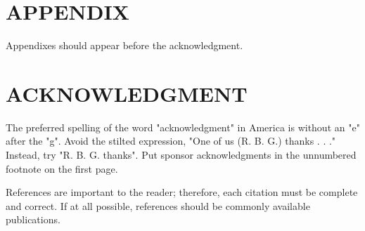 \documentclass[letterpaper, 10 pt, conference]{ieeeconf}  %
\begin{document}






\section*{APPENDIX}

Appendixes should appear before the acknowledgment.

\section*{ACKNOWLEDGMENT}

The preferred spelling of the word "acknowledgment" in America is without an "e" after the "g". Avoid the stilted expression, "One of us (R. B. G.) thanks . . ."  Instead, try "R. B. G. thanks". Put sponsor acknowledgments in the unnumbered footnote on the first page.




References are important to the reader; therefore, each citation must be complete and correct. If at all possible, references should be commonly available publications.




\end{document}
